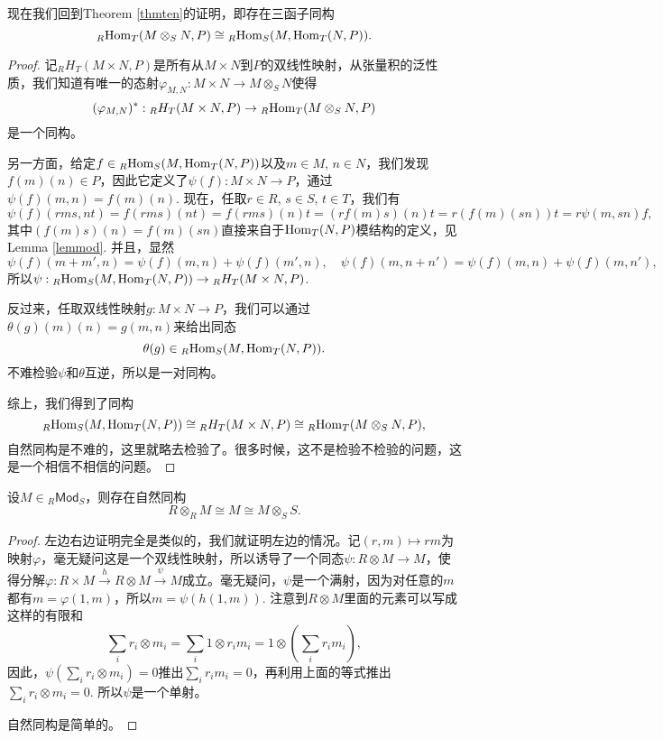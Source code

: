 \begin{para}
现在我们回到Theorem \ref{thmten}的证明，即存在三函子同构
\[
	{}_R\!\operatorname{Hom}_{T}(M\otimes_S N,P)\cong {}_R\!\operatorname{Hom}_S(M,\operatorname{Hom}_{T}(N,P)).
\]

\begin{proof}
记${}_RH_T(M\times N,P)$是所有从$M\times N$到$P$的双线性映射，从张量积的泛性质，我们知道有唯一的态射$\varphi_{M,N}:M\times N\to M\otimes_S N$使得
\[
	(\varphi_{M,N})^*:{}_RH_T(M\times N,P)\to {}_R\!\operatorname{Hom}_{T}(M\otimes_S N,P)
\]
是一个同构。

另一方面，给定$f\in {}_R\!\operatorname{Hom}_S(M,\operatorname{Hom}_{T}(N,P))$以及$m\in M$, $n\in N$，我们发现$f(m)(n)\in P$，因此它定义了$\psi(f):M\times N \to P$，通过$\psi(f)(m,n)=f(m)(n)$. 现在，任取$r\in R$, $s\in S$, $t\in T$，我们有
\[
	\psi(f)(rms,nt)=f(rms)(nt)=f(rms)(n)t=(rf(m)s)(n)t=r(f(m)(sn))t=r\psi(m,sn)f,
\]
其中$(f(m)s)(n)=f(m)(sn)$直接来自于$\operatorname{Hom}_{T}(N,P)$模结构的定义，见Lemma \ref{lemmod}. 并且，显然
\[
	\psi(f)(m+m',n)=\psi(f)(m,n)+\psi(f)(m',n),\quad \psi(f)(m,n+n')=\psi(f)(m,n)+\psi(f)(m,n'),
\]
所以$\psi:{}_R\!\operatorname{Hom}_S(M,\operatorname{Hom}_{T}(N,P))\to {}_RH_T(M\times N,P)$. 

反过来，任取双线性映射$g:M\times N \to P$，我们可以通过$\theta(g)(m)(n)=g(m,n)$来给出同态
\[
	\theta(g)\in {}_R\!\operatorname{Hom}_S(M,\operatorname{Hom}_{T}(N,P)).
\]
不难检验$\psi$和$\theta$互逆，所以是一对同构。

综上，我们得到了同构
\[
	{}_R\!\operatorname{Hom}_S(M,\operatorname{Hom}_{T}(N,P))\cong {}_RH_T(M\times N,P)\cong {}_R\!\operatorname{Hom}_{T}(M\otimes_S N,P),
\]
自然同构是不难的，这里就略去检验了。很多时候，这不是检验不检验的问题，这是一个相信不相信的问题。
\end{proof}
\end{para}

\begin{pro}
设$M\in {}_R\mathsf{Mod}_S$，则存在自然同构
\[
	R\otimes_R M\cong M\cong M\otimes_S S.
\]
\end{pro}

\begin{proof}
左边右边证明完全是类似的，我们就证明左边的情况。记$(r,m)\mapsto rm$为映射$\varphi$，毫无疑问这是一个双线性映射，所以诱导了一个同态$\psi:R\otimes M\to M$，使得分解$\varphi:R\times M\xrightarrow{h} R\otimes M\xrightarrow{\psi} M$成立。毫无疑问，$\psi$是一个满射，因为对任意的$m$都有$m=\varphi(1,m)$，所以$m=\psi(h(1,m))$. 注意到$R\otimes M$里面的元素可以写成这样的有限和
\[
\sum_i r_i\otimes m_i=\sum_i 1\otimes r_im_i=1\otimes \left(\sum_i r_i m_i\right),
\]
因此，$\psi\left(\sum_i r_i\otimes m_i\right)=0$推出$\sum_i r_i m_i=0$，再利用上面的等式推出$\sum_i r_i\otimes m_i=0$. 所以$\psi$是一个单射。

自然同构是简单的。
\end{proof}


